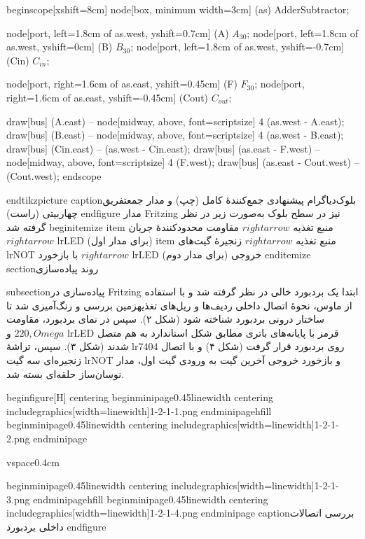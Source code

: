 begin{scope}[xshift=8cm]
node[box, minimum width=3cm] (as) {AdderSubtractor};

node[port, left=1.8cm of as.west, yshift=0.7cm]  (A)   {$A_{30}$};
node[port, left=1.8cm of as.west, yshift=0cm]    (B)   {$B_{30}$};
node[port, left=1.8cm of as.west, yshift=-0.7cm] (Cin) {$C_{in}$};

node[port, right=1.6cm of as.east, yshift=0.45cm]  (F)    {$F_{30}$};
node[port, right=1.6cm of as.east, yshift=-0.45cm] (Cout) {$C_{out}$};

draw[bus] (A.east)   -- node[midway, above, font=scriptsize] {4} (as.west - A.east);
draw[bus] (B.east)   -- node[midway, above, font=scriptsize] {4} (as.west - B.east);
draw[bus] (Cin.east) -- (as.west - Cin.east);
draw[bus] (as.east - F.west)    -- node[midway, above, font=scriptsize] {4} (F.west);
draw[bus] (as.east - Cout.west) -- (Cout.west);
end{scope}

end{tikzpicture}
caption{بلوک‌دیاگرام پیشنهادی جمع‌کنندهٔ کامل (چپ) و مدار جمعتفریق چهاربیتی (راست)}
end{figure}
مدار Fritzing نیز در سطح بلوک به‌صورت زیر در نظر گرفته شد
begin{itemize}
    item منبع تغذیه $rightarrow$ مقاومت محدودکنندهٔ جریان $rightarrow$ lr{LED} (برای مدار اول)
    item منبع تغذیه $rightarrow$ زنجیرهٔ گیت‌های lr{NOT} با بازخورد $rightarrow$ lr{LED} خروجی (برای مدار دوم)
end{itemize}
section{روند پیاده‌سازی}

subsection{پیاده‌سازی در Fritzing}
ابتدا یک بردبورد خالی در نظر گرفته شد و با استفاده از ماوس، نحوهٔ اتصال داخلی ردیف‌ها و ریل‌های تغذیهزمین بررسی و رنگ‌آمیزی شد تا ساختار درونی بردبورد شناخته شود (شکل ۲). سپس در نمای بردبورد، مقاومت $220,Omega$ و lr{LED} قرمز با پایانه‌های باتری مطابق شکل استاندارد به هم متصل شدند (شکل ۳). سپس، تراشهٔ lr{7404} روی بردبورد قرار گرفت (شکل ۴) و با اتصال زنجیره‌ای سه گیت lr{NOT} و بازخورد خروجی آخرین گیت به ورودی گیت اول، مدار نوسان‌ساز حلقه‌ای بسته شد.

begin{figure}[H]
centering
begin{minipage}{0.45linewidth}
    centering
    includegraphics[width=linewidth]{1-2-1-1.png}
end{minipage}hfill
begin{minipage}{0.45linewidth}
    centering
    includegraphics[width=linewidth]{1-2-1-2.png}
end{minipage}

vspace{0.4cm}

begin{minipage}{0.45linewidth}
    centering
    includegraphics[width=linewidth]{1-2-1-3.png}
end{minipage}hfill
begin{minipage}{0.45linewidth}
    centering
    includegraphics[width=linewidth]{1-2-1-4.png}
end{minipage}
caption{بررسی اتصالات داخلی بردبورد}
end{figure}


